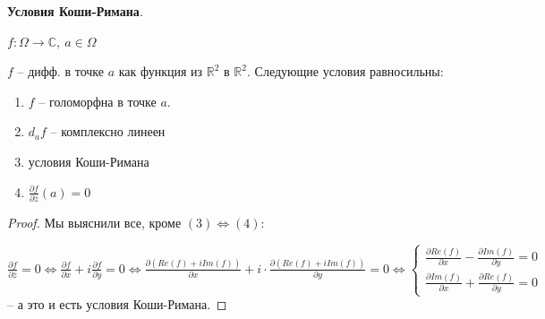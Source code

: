 \begin{theorem}
    \textbf{Условия Коши-Римана}.

    $f: \Omega \rightarrow \mathbb{C}, \ a \in \Omega$

    $f$ -- дифф. в точке $a$ как функция из $\mathbb{R}^2$ в $\mathbb{R}^2$. Следующие условия равносильны:

    \begin{enumerate}
        \item {
            $f$ -- голоморфна в точке $a$.
        }
        \item {
            $d_a f$ -- комплексно линеен
        }
        \item {
            условия Коши-Римана
        }
        \item {
            $\frac{\partial f}{\partial \overline{z}} (a) = 0$
        }
    \end{enumerate}
\end{theorem}

\begin{proof}
    Мы выяснили все, кроме $(3) \Leftrightarrow (4)$:

    $\frac{\partial f}{\partial \overline{z}} = 0 \Leftrightarrow \frac{\partial f}{\partial x} + i \frac{\partial f}{\partial y} = 0 \Leftrightarrow \frac{\partial (Re(f) + i Im(f))}{\partial x} + i \cdot \frac{\partial (Re (f) + i Im (f))}{\partial y} = 0 \Leftrightarrow \begin{cases}
        \frac{\partial Re(f)}{\partial x} - \frac{\partial Im (f)}{\partial y} = 0 \\ 
        \frac{\partial Im(f)}{\partial x} + \frac{\partial Re(f)}{\partial y} = 0
    \end{cases}$ -- а это и есть условия Коши-Римана.
\end{proof}

